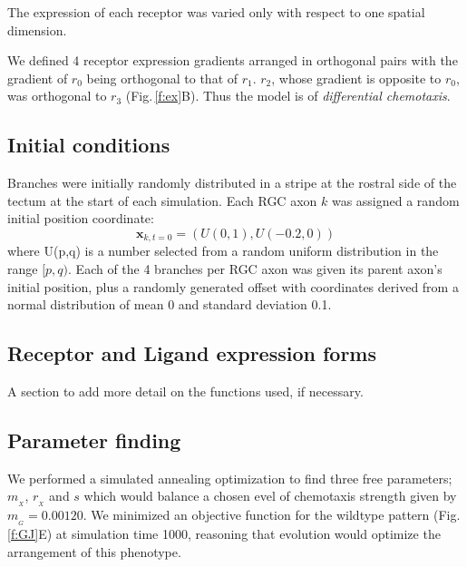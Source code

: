 \documentclass[9pt]{elife} %
\begin{document}
The expression of each receptor was varied only with respect to one spatial dimension.

We defined 4 receptor expression gradients arranged in orthogonal pairs with the gradient of $r_0$ being orthogonal to that of $r_1$. $r_2$, whose gradient is opposite to $r_0$, was orthogonal to $r_3$ (Fig.\,\ref{f:ex}B). Thus the model is of \emph{differential chemotaxis}.

\subsection*{Initial conditions}
Branches were initially randomly distributed in a stripe at the rostral side of the tectum at the start of each simulation.
Each RGC axon $k$ was assigned a random initial position coordinate:
\begin{equation}\label{e:ic}
\mathbf{x}_{k,t=0} = (U(0,1), U(-0.2,0))
\end{equation}
where U(p,q) is a number selected from a random uniform distribution in the range $[p,q)$. Each of the 4 branches per RGC axon was given its parent axon's initial position, plus a randomly generated offset with coordinates derived from a normal distribution of mean 0 and standard deviation 0.1.

\subsection*{Receptor and Ligand expression forms}

A section to add more detail on the functions used, if necessary.

\subsection*{Parameter finding}

We performed a simulated annealing optimization to find three free parameters; $m_{\!_X}$, $r_{\!_X}$ and $s$ which would balance a chosen evel of chemotaxis strength given by $m_{\!_G}=0.00120$.
We minimized an objective function for the wildtype pattern (Fig.\,\ref{f:GJ}E) at simulation time 1000, reasoning that evolution would optimize the arrangement of this phenotype.
\end{document}

